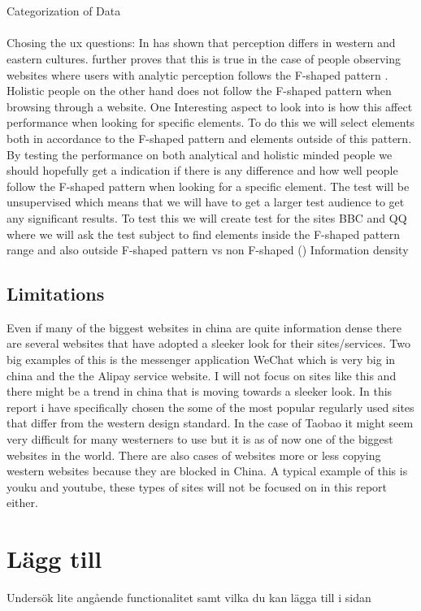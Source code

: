   \\\\
  Categorization of Data
  \\\\
  Chosing the ux questions:
  In \cite{Holistic_vs_Analytic} has shown that perception differs in western and eastern cultures. \cite{cross_web} further proves that this is true in the case of people observing websites where users with analytic perception follows the F-shaped pattern \cite{pernice2014people}. Holistic people on the other hand does not follow the F-shaped pattern when browsing through a website. \cite{cross_web} One Interesting aspect to look into is how this affect performance when looking for specific elements. To do this we will select elements both in accordance to the F-shaped pattern and elements outside of this pattern. By testing the performance on both analytical and holistic minded people we should hopefully get a indication if there is any difference and how well people follow the F-shaped pattern when looking for a specific element. The test will be unsupervised which means that we will have to get a larger test audience to get any significant results. To test this we will create test for the sites BBC and QQ where we will ask the test subject to find elements inside the F-shaped pattern range and also outside
  F-shaped pattern vs non F-shaped (\cite{cross_web})
  Information density
   
 \subsection{Limitations}
 Even if many of the biggest websites in china are quite information dense there are several websites that have adopted a sleeker look for their sites/services. Two big examples of this is the messenger application WeChat which is very big in china and the the Alipay service website. I will not focus on sites like this and there might be a trend in china that is moving towards a sleeker look. In this report i have specifically chosen the some of the most popular regularly used sites that differ from the western design standard. In the case of Taobao it might seem very difficult for many westerners to use but it is as of now one of the biggest websites in the world. There are also cases of websites more or less copying western websites because they are blocked in China. A typical example of this is youku and youtube, these types of sites will not be focused on in this report either.
 
 \section{Lägg till}
 Undersök lite angående functionalitet samt vilka du kan lägga till i sidan